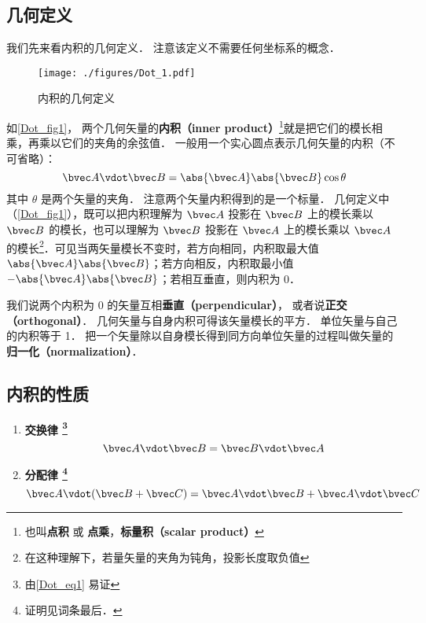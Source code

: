 

\subsection{几何定义}
我们先来看内积的几何定义． 注意该定义不需要任何坐标系的概念．
\begin{figure}[th]
\centering
\texttt{[image: ./figures/Dot\_1.pdf]}
\caption{内积的几何定义}\label{Dot_fig1}
\end{figure}

如\autoref{Dot_fig1}， 两个几何矢量的\textbf{内积（inner product）}\footnote{也叫\textbf{点积} 或 \textbf{点乘}，\textbf{标量积（scalar product）}}就是把它们的模长相乘，再乘以它们的夹角的余弦值． 一般用一个实心圆点表示几何矢量的内积（不可省略）：
\begin{equation}\label{Dot_eq1}
\bvec A \vdot \bvec B = \abs{\bvec A} \abs{\bvec B} \cos\theta 
\end{equation}
其中 $\theta$ 是两个矢量的夹角． 注意两个矢量内积得到的是一个标量． 几何定义中（\autoref{Dot_fig1}），既可以把内积理解为 $\bvec A$ 投影在 $\bvec B$ 上的模长乘以 $\bvec B$ 的模长，也可以理解为 $\bvec B$ 投影在 $\bvec A$ 上的模长乘以 $\bvec A$ 的模长\footnote{在这种理解下，若量矢量的夹角为钝角，投影长度取负值}．可见当两矢量模长不变时，若方向相同，内积取最大值 $\abs{\bvec A}\abs{\bvec B}$；若方向相反，内积取最小值 $-\abs{\bvec A}\abs{\bvec B}$；若相互垂直，则内积为 0．

我们说两个内积为 0 的矢量互相\textbf{垂直（perpendicular）}， 或者说\textbf{正交（orthogonal）}． 几何矢量与自身内积可得该矢量模长的平方． 单位矢量与自己的内积等于 1． 把一个矢量除以自身模长得到同方向单位矢量的过程叫做矢量的\textbf{归一化（normalization）}．

\subsection{内积的性质}

\begin{enumerate}
\item \textbf{交换律 \footnote{由\autoref{Dot_eq1} 易证}}
\begin{equation}\label{Dot_eq2}
\bvec A \vdot \bvec B = \bvec B \vdot \bvec A
\end{equation}

\item \textbf{分配律 \footnote{证明见词条最后．}}
\begin{equation}\label{Dot_eq3}
\bvec A \vdot (\bvec B + \bvec C) = \bvec A \vdot \bvec B + \bvec A \vdot \bvec C
\end{equation}
\end{enumerate}

